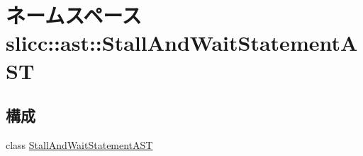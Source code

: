 \hypertarget{namespaceslicc_1_1ast_1_1StallAndWaitStatementAST}{
\section{ネームスペース slicc::ast::StallAndWaitStatementAST}
\label{namespaceslicc_1_1ast_1_1StallAndWaitStatementAST}
}
\subsection*{構成}
\begin{DoxyCompactItemize}
\item 
class \hyperlink{classslicc_1_1ast_1_1StallAndWaitStatementAST_1_1StallAndWaitStatementAST}{StallAndWaitStatementAST}
\end{DoxyCompactItemize}
